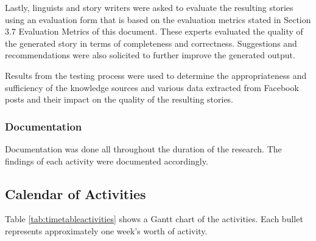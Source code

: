 Lastly, linguists and story writers were asked to evaluate the resulting stories using an evaluation form that is based on the evaluation metrics stated in Section 3.7 Evaluation Metrics of this document. These experts evaluated the quality of the generated story in terms of completeness and correctness. Suggestions and recommendations were also solicited to further improve the generated output.

Results from the testing process were used to determine the appropriateness and sufficiency of the knowledge sources and various data extracted from Facebook posts and their impact on the quality of the resulting stories.

\subsubsection{Documentation}
Documentation was done all throughout the duration of the research. The findings of each activity were documented accordingly.

\subsection{Calendar of Activities}

Table \ref{tab:timetableactivities} shows a Gantt chart of the activities. Each bullet represents approximately one week's worth of activity.

%
%
\newcommand{\weekone}{\textbullet}
\newcommand{\weektwo}{\textbullet \textbullet}
\newcommand{\weekthree}{\textbullet \textbullet \textbullet}
\newcommand{\weekfour}{\textbullet \textbullet \textbullet \textbullet}

